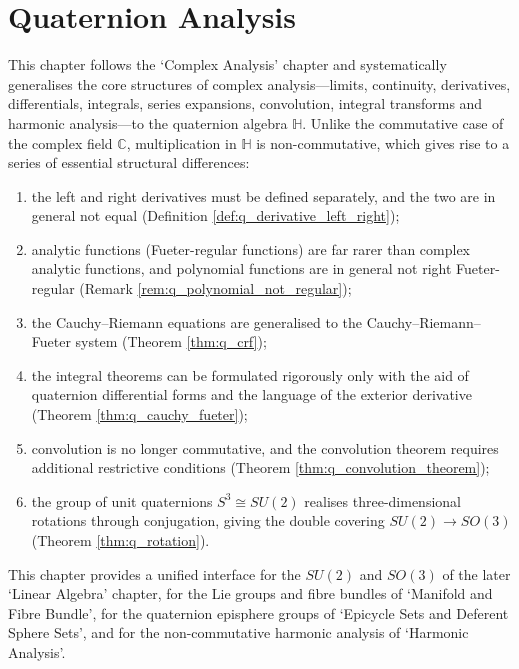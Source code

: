 \chapter{Quaternion Analysis}
\label{chap:quaternion_analysis}

\begin{remark}\label{rem:q_chapter_positioning}
This chapter follows the `Complex Analysis' chapter and systematically generalises the core structures of complex analysis---limits, continuity, derivatives, differentials, integrals, series expansions, convolution, integral transforms and harmonic analysis---to the quaternion algebra $\mathbb{H}$. Unlike the commutative case of the complex field $\mathbb{C}$, multiplication in $\mathbb{H}$ is non-commutative, which gives rise to a series of essential structural differences:
\begin{enumerate}[label=(\roman*)]
    \item the left and right derivatives must be defined separately, and the two are in general not equal (Definition \ref{def:q_derivative_left_right});
    \item analytic functions (Fueter-regular functions) are far rarer than complex analytic functions, and polynomial functions are in general not right Fueter-regular (Remark \ref{rem:q_polynomial_not_regular});
    \item the Cauchy--Riemann equations are generalised to the Cauchy--Riemann--Fueter system (Theorem \ref{thm:q_crf});
    \item the integral theorems can be formulated rigorously only with the aid of quaternion differential forms and the language of the exterior derivative (Theorem \ref{thm:q_cauchy_fueter});
    \item convolution is no longer commutative, and the convolution theorem requires additional restrictive conditions (Theorem \ref{thm:q_convolution_theorem});
    \item the group of unit quaternions $S^3\cong SU(2)$ realises three-dimensional rotations through conjugation, giving the double covering $SU(2)\to SO(3)$ (Theorem \ref{thm:q_rotation}).
\end{enumerate}
This chapter provides a unified interface for the $SU(2)$ and $SO(3)$ of the later `Linear Algebra' chapter, for the Lie groups and fibre bundles of `Manifold and Fibre Bundle', for the quaternion episphere groups of `Epicycle Sets and Deferent Sphere Sets', and for the non-commutative harmonic analysis of `Harmonic Analysis'.


\end{remark}
